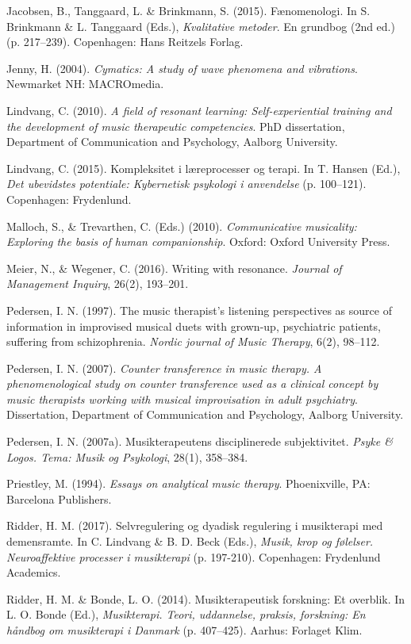 \begin{thebibliography}{99}
\item Jacobsen, B., Tanggaard, L. \& Brinkmann, S. (2015). Fænomenologi. In S. Brinkmann \& L. Tanggaard (Eds.), \textit{Kvalitative metoder}. En grundbog (2nd ed.) (p. 217–239). Copenhagen: Hans Reitzels Forlag. 
\item Jenny, H. (2004). \textit{Cymatics: A study of wave phenomena and vibrations}. Newmarket NH: MACROmedia.
\item Lindvang, C. (2010). \textit{A field of resonant learning: Self-experiential training and the development of music therapeutic competencies}. PhD dissertation, Department of Communication and Psychology, Aalborg University.
\item Lindvang, C. (2015). Kompleksitet i læreprocesser og terapi. In T. Hansen (Ed.), \textit{Det ubevidstes potentiale: Kybernetisk psykologi i anvendelse} (p. 100–121). Copenhagen: Frydenlund.
\item Malloch, S., \& Trevarthen, C. (Eds.) (2010). \textit{Communicative musicality: Exploring the basis of human companionship}. Oxford: Oxford University Press.
\item Meier, N., \& Wegener, C. (2016). Writing with resonance. \textit{Journal of Management Inquiry}, 26(2), 193–201. 
\item Pedersen, I. N. (1997). The music therapist's listening perspectives as source of information in improvised musical duets with grown-up, psychiatric patients, suffering from schizophrenia. \textit{Nordic journal of Music Therapy}, 6(2), 98–112.
\item Pedersen, I. N. (2007). \textit{Counter transference in music therapy. A phenomenological study on counter transference used as a clinical concept by music therapists working with musical improvisation in adult psychiatry}. Dissertation, Department of Communication and Psychology, Aalborg University.
\item Pedersen, I. N. (2007a). Musikterapeutens disciplinerede subjektivitet. \textit{Psyke \& Logos. Tema: Musik og Psykologi}, 28(1), 358–384. 
\item Priestley, M. (1994). \textit{Essays on analytical music therapy}. Phoenixville, PA: Barcelona Publishers.
\item Ridder, H. M. (2017). Selvregulering og dyadisk regulering i musikterapi med demensramte. In C. Lindvang \& B. D. Beck (Eds.), \textit{Musik, krop og følelser. Neuroaffektive processer i musikterapi} (p. 197-210). Copenhagen: Frydenlund Academics.
\item Ridder, H. M. \& Bonde, L. O. (2014). Musikterapeutisk forskning: Et overblik. In L. O. Bonde (Ed.), \textit{Musikterapi. Teori, uddannelse, praksis, forskning: En håndbog om musikterapi i Danmark} (p. 407–425). Aarhus: Forlaget Klim.

\end{thebibliography}

